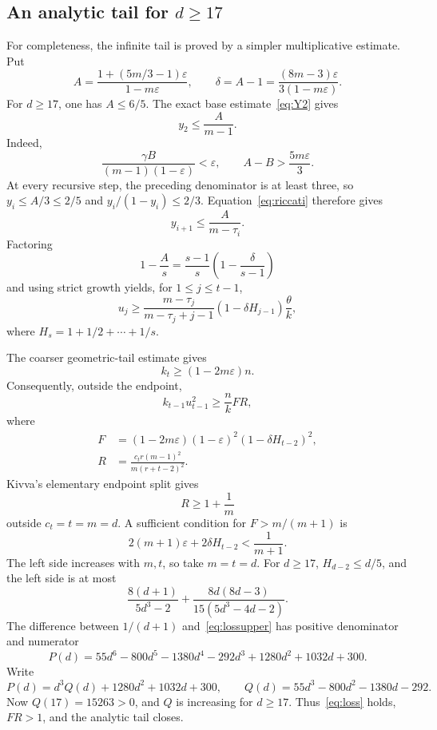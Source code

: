 \documentclass[11pt]{amsart}
\theoremstyle{definition}
\newcommand{\eps}{\varepsilon}
\newcommand{\gam}{\gamma}
\begin{document}
\subsection{An analytic tail for $d\ge17$}
For completeness, the infinite tail is proved by a simpler multiplicative estimate.  Put
\begin{equation}\label{eq:Adef}
 A=\frac{1+(5m/3-1)\eps}{1-m\eps},
 \qquad
 \delta=A-1=\frac{(8m-3)\eps}{3(1-m\eps)}.
\end{equation}
For $d\ge17$, one has $A\le6/5$.  The exact base estimate~\eqref{eq:Y2} gives
\[
 y_2\le\frac{A}{m-1}.
\]
Indeed,
\[
 \frac{\gam B}{(m-1)(1-\eps)}<\eps,
 \qquad A-B>\frac{5m\eps}{3}.
\]
At every recursive step, the preceding denominator is at least three, so $y_i\le A/3\le2/5$ and $y_i/(1-y_i)\le2/3$.  Equation~\eqref{eq:riccati} therefore gives
\[
 y_{i+1}\le\frac{A}{m-\tau_i}.
\]
Factoring
\[
 1-\frac{A}{s}=\frac{s-1}{s}
 \left(1-\frac{\delta}{s-1}\right)
\]
and using strict growth yields, for $1\le j\le t-1$,
\begin{equation}\label{eq:multiplicativeU}
 u_j\ge
 \frac{m-\tau_j}{m-\tau_j+j-1}
 \left(1-\delta H_{j-1}\right)\frac\theta k,
\end{equation}
where $H_s=1+1/2+\cdots+1/s$.

The coarser geometric-tail estimate gives
\[
 k_t\ge(1-2m\eps)n.
\]
Consequently, outside the endpoint,
\begin{equation}\label{eq:FR}
 k_{t-1}u_{t-1}^2\ge\frac{n}{k}FR,
\end{equation}
where
\begin{align}
 F&=(1-2m\eps)(1-\eps)^2
 \left(1-\delta H_{t-2}\right)^2,\label{eq:F}\\
 R&=\frac{c_t r(m-1)^2}{m(r+t-2)^2}.
\end{align}
Kivva's elementary endpoint split gives
\begin{equation}\label{eq:R}
 R\ge1+\frac1m
\end{equation}
outside $c_t=t=m=d$.  A sufficient condition for $F>m/(m+1)$ is
\begin{equation}\label{eq:loss}
 2(m+1)\eps+2\delta H_{t-2}<\frac1{m+1}.
\end{equation}
The left side increases with $m,t$, so take $m=t=d$.  For $d\ge17$, $H_{d-2}\le d/5$, and the left side is at most
\begin{equation}\label{eq:lossupper}
 \frac{8(d+1)}{5d^3-2}
 +\frac{8d(8d-3)}{15(5d^3-4d-2)}.
\end{equation}
The difference between $1/(d+1)$ and~\eqref{eq:lossupper} has positive denominator and numerator
\begin{equation}\label{eq:poly}
 P(d)=55d^6-800d^5-1380d^4-292d^3
      +1280d^2+1032d+300.
\end{equation}
Write
\[
 P(d)=d^3Q(d)+1280d^2+1032d+300,
 \qquad
 Q(d)=55d^3-800d^2-1380d-292.
\]
Now $Q(17)=15263>0$, and $Q$ is increasing for $d\ge17$.  Thus~\eqref{eq:loss} holds, $FR>1$, and the analytic tail closes.
\end{document}
